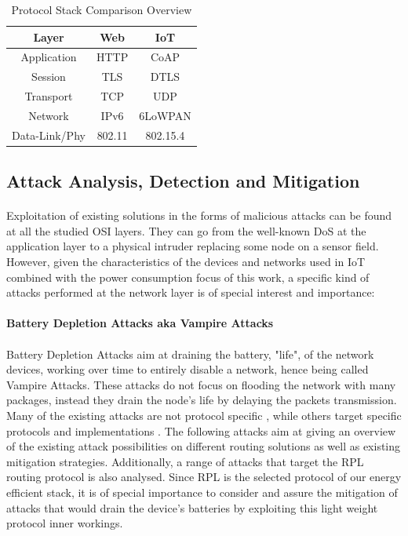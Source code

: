 \begin{table}[h]
	\centering
	\begin{center} \caption{Protocol Stack Comparison Overview } \label{tab:stack}\end{center}
	\begin{tabular}{c|c|c}
		Layer & Web & IoT \\
		\hline
		Application & \ac{HTTP} & \ac{CoAP} \\
		Session & \ac{TLS} & \ac{DTLS} \\
		Transport & \ac{TCP} & \ac{UDP} \\
		Network & IPv6 & 6LoWPAN \\
		Data-Link/Phy & 802.11 & 802.15.4
	\end{tabular}
\end{table}

\subsection{Attack Analysis, Detection and Mitigation}
\label{sec:attack_analysis}
\paragraph{}
Exploitation of existing solutions in the forms of malicious attacks can be found at all the studied OSI layers. They can go from the well-known \ac{DoS} at the application layer to a physical intruder replacing some node on a sensor field. However, given the characteristics of the devices and networks used in \ac{IoT} combined with the power consumption focus of this work, a specific kind of attacks performed at the network layer is of special interest and importance:

\paragraph{\textbf{Battery Depletion Attacks aka Vampire Attacks}}
\paragraph{}
Battery Depletion Attacks aim at draining the battery, "life", of the network devices, working over time to entirely disable a network, hence being called Vampire Attacks. These attacks do not focus on flooding the network with many packages, instead they drain the node's life by delaying the packets transmission. Many of the existing attacks are not protocol specific \cite{Vasserman2013}, while others target specific protocols and implementations \cite{Pongle2015}. The following attacks aim at giving an overview of the existing attack possibilities on different routing solutions as well as existing mitigation strategies. Additionally, a range of attacks that target the RPL routing protocol is also analysed. Since RPL is the selected protocol of our energy efficient stack, it is of special importance to consider and assure the mitigation of attacks that would drain the device's batteries by exploiting this light weight protocol inner workings.   

